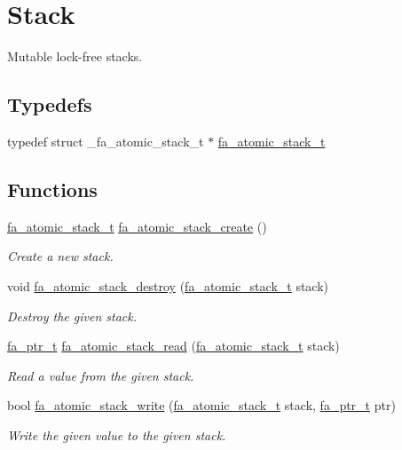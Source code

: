 \hypertarget{group___fa_atomic_stack}{\section{Stack}
\label{group___fa_atomic_stack}
}


Mutable lock-\/free stacks.  


\subsection*{Typedefs}
\begin{DoxyCompactItemize}
\item 
typedef struct \-\_\-fa\-\_\-atomic\-\_\-stack\-\_\-t $\ast$ \hyperlink{group___fa_atomic_stack_ga12448e3a1d7002a702efc2a78eebfa69}{fa\-\_\-atomic\-\_\-stack\-\_\-t}
\end{DoxyCompactItemize}
\subsection*{Functions}
\begin{DoxyCompactItemize}
\item 
\hyperlink{group___fa_atomic_stack_ga12448e3a1d7002a702efc2a78eebfa69}{fa\-\_\-atomic\-\_\-stack\-\_\-t} \hyperlink{group___fa_atomic_stack_gacfb347f6def65c5207877d6dba9fbc62}{fa\-\_\-atomic\-\_\-stack\-\_\-create} ()
\begin{DoxyCompactList}\small\item\em Create a new stack. \end{DoxyCompactList}\item 
void \hyperlink{group___fa_atomic_stack_gafd7a22df157d016f336a304c311c0634}{fa\-\_\-atomic\-\_\-stack\-\_\-destroy} (\hyperlink{group___fa_atomic_stack_ga12448e3a1d7002a702efc2a78eebfa69}{fa\-\_\-atomic\-\_\-stack\-\_\-t} stack)
\begin{DoxyCompactList}\small\item\em Destroy the given stack. \end{DoxyCompactList}\item 
\hyperlink{group___fa_ga915ddeae99ad7568b273d2b876425197}{fa\-\_\-ptr\-\_\-t} \hyperlink{group___fa_atomic_stack_ga7d8023ec59ac028da1188064eff7f642}{fa\-\_\-atomic\-\_\-stack\-\_\-read} (\hyperlink{group___fa_atomic_stack_ga12448e3a1d7002a702efc2a78eebfa69}{fa\-\_\-atomic\-\_\-stack\-\_\-t} stack)
\begin{DoxyCompactList}\small\item\em Read a value from the given stack. \end{DoxyCompactList}\item 
bool \hyperlink{group___fa_atomic_stack_gae7220769ca5217af9935f3bde86fbf75}{fa\-\_\-atomic\-\_\-stack\-\_\-write} (\hyperlink{group___fa_atomic_stack_ga12448e3a1d7002a702efc2a78eebfa69}{fa\-\_\-atomic\-\_\-stack\-\_\-t} stack, \hyperlink{group___fa_ga915ddeae99ad7568b273d2b876425197}{fa\-\_\-ptr\-\_\-t} ptr)
\begin{DoxyCompactList}\small\item\em Write the given value to the given stack. \end{DoxyCompactList}\end{DoxyCompactItemize}



